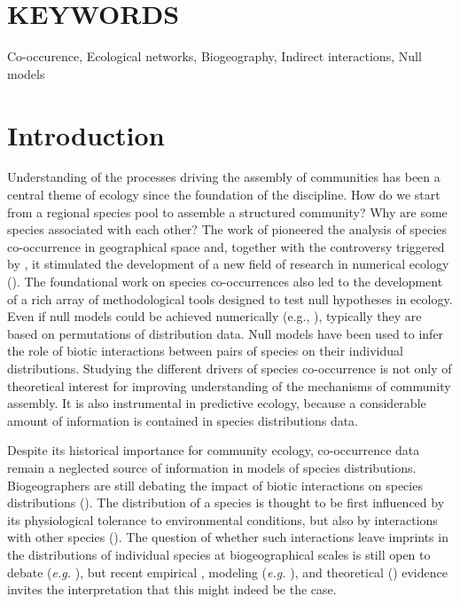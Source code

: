 \section{KEYWORDS}

Co-occurence, Ecological networks, Biogeography, Indirect interactions, Null models


\section{Introduction}
\label{intro}

Understanding of the processes driving the assembly of communities has been a central theme of ecology since the foundation of the discipline. How do we start from a regional species pool to assemble a structured community? Why are some species associated with each other? The work of \cite{Diamond1975Assembly} pioneered the analysis of species co-occurrence in geographical space and, together with the controversy triggered by
\cite{Connor1979Assembly}, it stimulated the development of a new field of
research in numerical ecology (\citealt{Stone1990Checkerboard, Gotelli1996Null,
Legendre2012Numerical}). The foundational work on species co-occurrences also led to the development of a rich array of methodological tools designed to test null hypotheses in ecology. Even if null models could be achieved numerically (e.g., \cite{Araujo2011Using}), typically they are based on permutations of distribution data. Null models have been used to infer the role of biotic interactions between pairs of species on their individual distributions. Studying the different drivers of species co-occurrence is not only of theoretical interest for improving understanding of the mechanisms of community assembly. It is also instrumental in predictive ecology, because a considerable amount of information is contained in species distributions data.

Despite its historical importance for community ecology, co-occurrence data remain a neglected source of information in models of species distributions. Biogeographers are still debating the impact of biotic interactions on species distributions (\citealt{Guisan2005Predicting, Gotelli2010Macroecological,
Kissling2011Towards,Pellissier2013Combining}). The distribution of a species
is thought to be first influenced by its physiological tolerance to
environmental conditions, but also by interactions with other species
(\citealt{Hutchinson1957Concluding, Macarthur1972Geographical,
Peterson2011Ecologicala, Boulangeat2012Accounting}). The question of whether such
interactions leave imprints in the distributions of individual species at
biogeographical scales is still open to debate (\textit{e.g.}
\citealt{Davis1998Making}), but recent empirical
\citealt{Gotelli2010Macroecological}, modeling (\textit{e.g.}
\citealt{Araujo2007Importance}), and theoretical (\citealt{Araujo2011Using})
evidence invites the interpretation that this might indeed be the case.

